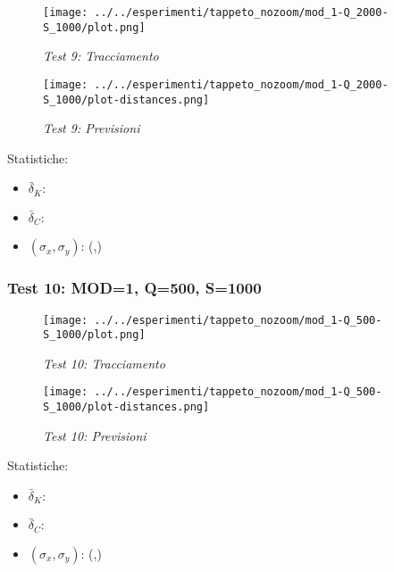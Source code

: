 \begin{figure}[hb]
\centering
\texttt{[image: ../../esperimenti/tappeto\_nozoom/mod\_1-Q\_2000-S\_1000/plot.png]}
\caption{\textit{Test 9: Tracciamento}}
\end{figure}

\begin{figure}[hb]
\centering
\texttt{[image: ../../esperimenti/tappeto\_nozoom/mod\_1-Q\_2000-S\_1000/plot-distances.png]}
\caption{\textit{Test 9: Previsioni}}
\end{figure}

Statistiche:
\begin{itemize}
\item \begin{math} \bar \delta_K:  \end{math}
\item \begin{math} \bar \delta_C:  \end{math}
\item \begin{math}(\sigma_x,\sigma_y)\end{math}: (,)
\end{itemize}

\newpage
\subsubsection{Test 10: MOD=1, Q=500, S=1000}

\begin{figure}[hb]
\centering
\texttt{[image: ../../esperimenti/tappeto\_nozoom/mod\_1-Q\_500-S\_1000/plot.png]}
\caption{\textit{Test 10: Tracciamento}}
\end{figure}

\begin{figure}[hb]
\centering
\texttt{[image: ../../esperimenti/tappeto\_nozoom/mod\_1-Q\_500-S\_1000/plot-distances.png]}
\caption{\textit{Test 10: Previsioni}}
\end{figure}

Statistiche:
\begin{itemize}
\item \begin{math} \bar \delta_K:  \end{math}
\item \begin{math} \bar \delta_C:  \end{math}
\item \begin{math}(\sigma_x,\sigma_y)\end{math}: (,)
\end{itemize}


